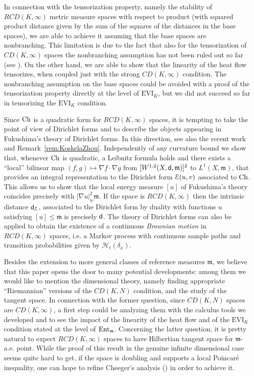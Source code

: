 \documentclass[reqno,11pt]{article}
\numberwithin{equation}{section}
\newcommand{\C}{\mathbb{C}}
\newcommand{\mm}{{\mbox{\boldmath$m$}}}
\newcommand{\sfd}{{\sf d}}
\newcommand{\EVI}[4]{\mathrm{EVI}_{#4}(#1,{#2}_W,#3)}
\newcommand{\entv}{{\rm Ent}_{\mm}}                    %
\newcommand{\weakgrad}[1]{|\nabla #1|_w}                %
\renewcommand{\C}{{\rm Ch}}
\newcommand{\rcd}[2]{RCD(#1,#2)}
\newcommand{\heatw}{{\mathscr H}}
\renewcommand{\EVI}{\ensuremath{\mathrm{EVI}}}
\renewcommand{\mm}{\mathfrak m}
\begin{document}
In connection with the tensorization property, namely the stability
of $\rcd K\infty$ metric measure spaces with respect to product
(with squared product distance given by the sum of the squares of
the distances in the base spaces), we are able to achieve it
assuming that the base spaces are nonbranching. This limitation is
due to the fact that also for the tensorization of $CD(K,\infty)$
spaces the nonbranching assumption has not been ruled out so far
(see \cite[Theorem 4.17]{Sturm06I}). On the other hand, we are able
to show that the linearity of the heat flow tensorizes, when coupled
just with the strong $CD(K,\infty)$ condition. The nonbranching
assumption on the base spaces could be avoided with a proof of the
tensorization property directly at the level of $\EVI_K$, but we did
not succeed so far in tensorizing the $\EVI_K$ condition.

Since $\C$ is a quadratic form for $\rcd K\infty $ spaces, it is
tempting to take the point of view of Dirichlet forms and to
describe the objects appearing in Fukushima's theory
\cite{Fukushima80} of Dirichlet forms. In this direction, see also
the recent work \cite{Koskela-Zhou11} and
Remark~\ref{rem:KoskelaZhou}. Independently of any curvature bound
we show that, whenever $\C$ is quadratic, a Leibnitz formula holds
and there exists a ``local'' bilinear map $(f,g)\mapsto\nabla
f\cdot\nabla g$ from $[W^{1,2}(X,\sfd,\mm)]^2$ to $L^1(X,\mm)$, that
provides an integral representation to the Dirichlet form ${\cal
E}(u,v)$ associated to $\C$. This allows us to show that the local
energy measure $[u]$ of Fukushima's theory coincides precisely with
$\weakgrad{u}^2\mm$. If the space is $\rcd K\infty$ then the
intrinsic distance $\sfd_{{\mathcal E}}$, associated to the
Dirichlet form by duality with functions $u$ satisfying $[u]\leq\mm$
is precisely $\sfd$. The theory of Dirichlet forms can also be
applied to obtain the existence of a continuous \emph{Brownian
motion} in $\rcd K\infty$ spaces, i.e. a Markov process with
continuous sample paths and transition probabilities given by
$\heatw_t(\delta_x)$.

Besides the extension to more general classes of reference measures
$\mm$, we believe that this paper opens the door to many potential
developments: among them we would like to mention the dimensional
theory, namely finding appropriate ``Riemannian'' versions of the
$CD(K,N)$ condition, and the study of the tangent space. In
connection with the former question, since $CD(K,N)$ spaces are
$CD(K,\infty)$, a first step could be analyzing them with the
calculus tools we developed and to see the impact of the linearity
of the heat flow and of the $\EVI_K$ condition stated at the level
of $\entv$. Concerning  the latter question, it is pretty natural to
expect $\rcd K\infty$ spaces to have Hilbertian tangent space for
$\mm$-a.e. point. While the proof of this result in the genuine
infinite dimensional case seems quite hard to get, if the space is
doubling and supports a local Poincar\'e inequality, one can hope to
refine Cheeger's analysis (\cite[Section~11]{Cheeger00}) in order to
achieve it.
\end{document}
